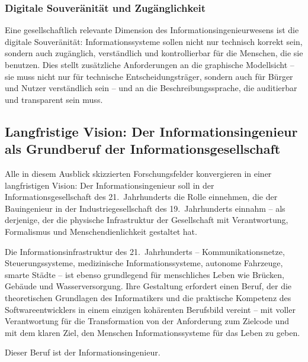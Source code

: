 ﻿\documentclass[a4paper,12pt]{article}
\theoremstyle{definition}
\begin{document}
\subsubsection{Digitale Souveränität und Zugänglichkeit}

Eine gesellschaftlich relevante Dimension des Informationsingenieurwesens ist die
digitale Souveränität: Informationssysteme sollen nicht nur technisch korrekt sein,
sondern auch zugänglich, verständlich und kontrollierbar für die Menschen, die sie
benutzen. Dies stellt zusätzliche Anforderungen an die graphische Modellsicht --
sie muss nicht nur für technische Entscheidungsträger, sondern auch für Bürger und
Nutzer verständlich sein -- und an die Beschreibungssprache, die auditierbar und
transparent sein muss.

\subsection{Langfristige Vision: Der Informationsingenieur als Grundberuf der Informationsgesellschaft}

Alle in diesem Ausblick skizzierten Forschungsfelder konvergieren in einer
langfristigen Vision: Der Informationsingenieur soll in der Informationsgesellschaft
des 21.~Jahrhunderts die Rolle einnehmen, die der Bauingenieur in der Industriegesellschaft
des 19.~Jahrhunderts einnahm -- als derjenige, der die physische Infrastruktur der
Gesellschaft mit Verantwortung, Formalismus und Menschendienlichkeit gestaltet hat.

Die Informationsinfrastruktur des 21.~Jahrhunderts -- Kommunikationsnetze, Steuerungssysteme,
medizinische Informationssysteme, autonome Fahrzeuge, smarte Städte -- ist ebenso
grundlegend für menschliches Leben wie Brücken, Gebäude und Wasserversorgung.
Ihre Gestaltung erfordert einen Beruf, der die theoretischen Grundlagen des Informatikers
und die praktische Kompetenz des Softwareentwicklers in einem einzigen kohärenten
Berufsbild vereint -- mit voller Verantwortung für die Transformation von der
Anforderung zum Zielcode und mit dem klaren Ziel, den Menschen Informationssysteme
für das Leben zu geben.

Dieser Beruf ist der Informationsingenieur.
\end{document}
